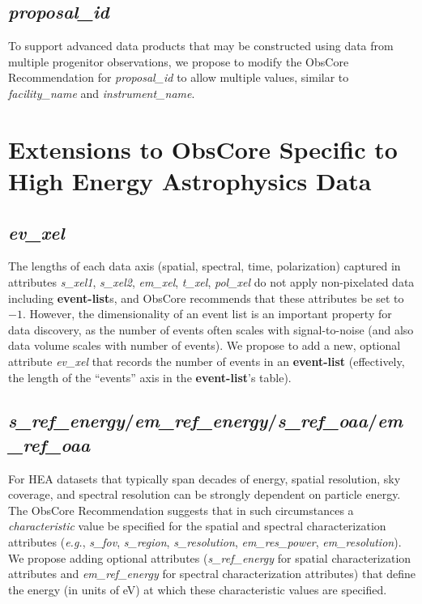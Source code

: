\documentclass[11pt,a4paper]{ivoa}
\begin{document}
\subsection{{\em proposal\_id}}

To support advanced data products that may be constructed using data from multiple progenitor observations, we propose to modify the ObsCore Recommendation for {\em proposal\_id\/} to allow multiple values, similar to {\em facility\_name\/} and {\em instrument\_name\/}.


\section{Extensions to ObsCore Specific to High Energy Astrophysics Data}
\label{sec:obscoreext}

\subsection{{\em ev\_xel}}

The lengths of each data axis (spatial, spectral, time, polarization) captured in attributes {\em s\_xel1\/}, {\em s\_xel2\/}, {\em em\_xel\/}, {\em t\_xel\/}, {\em pol\_xel\/} do not apply non-pixelated data including {\bf event-list}s, and ObsCore recommends that these attributes be set to $-1$.  However, the dimensionality of an event list is an important property for data discovery, as the number of events often scales with signal-to-noise (and also data volume scales with number of events).  We propose to add a new, optional attribute {\em ev\_xel\/} that records the number of events in an {\bf event-list} (effectively, the length of the ``events'' axis in the {\bf event-list}'s table).

\subsection{{\em s\_ref\_energy\/}/{\em em\_ref\_energy\/}/{\em s\_ref\_oaa\/}/{\em em\_ref\_oaa}}

For \gls{HEA} datasets that typically span decades of energy, spatial resolution, sky coverage, and spectral resolution can be strongly dependent on particle energy. The ObsCore Recommendation suggests that in such circumstances a {\em characteristic\/} value be specified for the spatial and spectral characterization attributes ({\em e.g.\/}, {\em s\_fov\/}, {\em s\_region\/}, {\em s\_resolution\/}, {\em em\_res\_power\/}, {\em em\_resolution\/}). We propose adding optional attributes ({\em s\_ref\_energy\/} for spatial characterization attributes and {\em em\_ref\_energy\/} for spectral characterization attributes) that define the energy (in units of eV) at which these characteristic values are specified.
\end{document}
